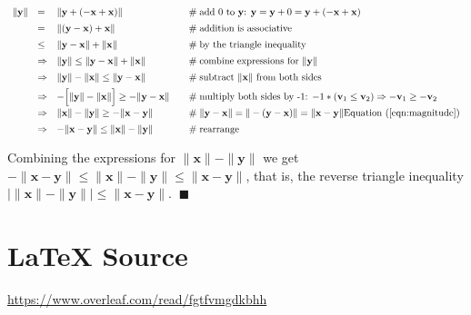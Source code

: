 \documentclass{article}
\theoremstyle{definition}
\begin{document}
\begin{equation*}
\begin{array}{lllll}
\| \mathbf{y} \|
&=& \| \mathbf{y} + (-\mathbf{x} + \mathbf{x})\|
					&\quad \mathrel{\#} \text{add 0 to $\mathbf{y}$: }
					\mathbf{y} = \mathbf{y} + 0
					= \mathbf{y} + (-\mathbf{x} + \mathbf{x}) \\
[5pt]
&=& \| (\mathbf{y} - \mathbf{x}) + \mathbf{x} \|
					&\quad \mathrel{\#} \text{addition is associative} \\
[5pt] 
&\leq& \| \mathbf{y} - \mathbf{x} \| + \| \mathbf{x} \| 
					&\quad \mathrel{\#} \text{by the triangle inequality} \\
[5pt]
&\Rightarrow& \| \mathbf{y} \| \leq \| \mathbf{y} - \mathbf{x} \| + \| \mathbf{x} \|
					&\quad \mathrel{\#} \text{combine expressions for $\| \mathbf{y} \|$}\\
[5pt]
&\Rightarrow& \| \mathbf{y} \| - \| \mathbf{x} \| \leq \| \mathbf{y} - \mathbf{x}\| 
					&\quad \mathrel{\#} \text{subtract $\| \mathbf{x} \|$ from both sides}\\
[5pt]
&\Rightarrow& - \Big [ \| \mathbf{y} \| - \| \mathbf{x} \| \Big ]\geq -\| \mathbf{y} - \mathbf{x}\|
					&\quad \mathrel{\#} \text{multiply both sides by -1: $- 1 * (\mathbf{v}_1 \leq \mathbf{v}_2) 
					\Rightarrow -\mathbf{v}_1 \geq -\mathbf{v}_2$} \\
[5pt]
&\Rightarrow& \| \mathbf{x} \| - \| \mathbf{y} \| \geq -\| \mathbf{x} - \mathbf{y}\|
					&\quad \mathrel{\#} \| \mathbf{y} - \mathbf{x}\|
					= \| - (\mathbf{y} - \mathbf{x}) \|
					= \| \mathbf{x} - \mathbf{y} \|
					\text{Equation (\ref{eqn:magnitude})} \\
[5pt]
&\Rightarrow& -\| \mathbf{x} - \mathbf{y}\| \leq \| \mathbf{x} \| - \| \mathbf{y} \| 
					&\quad \mathrel{\#} \text{rearrange}


\end{array}
\end{equation*}

\bigskip
{
\noindent
Combining the expressions for $\| \mathbf{x} \| - \| \mathbf{y} \|$
we get $-\| \mathbf{x} - \mathbf{y} \| 
\leq \| \mathbf{x} \| - \| \mathbf{y} 
\|\leq \| \mathbf{x} - \mathbf{y} \|$,
that is, the reverse triangle inequality
$\big | \| \mathbf{x} \| - \| \mathbf{y} \| \big | 
\leq \| \mathbf{x} - \mathbf{y}\|. \;\; \blacksquare$ 
\par}
%
%
\section*{\LaTeX \hspace{0.10 mm} Source}
\url{https://www.overleaf.com/read/fgtfvmgdkbhh}
%
%
%


%
%
\end{document}
